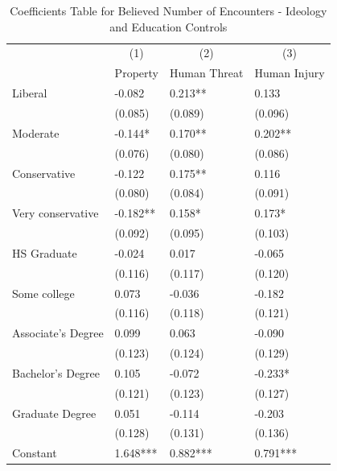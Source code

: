\documentclass[english,12pt]{article}
\begin{document}
\begin{table}[H]
    \centering
    \caption{Coefficients Table for Believed Number of Encounters - Ideology and Education Controls}
    \footnotesize
    \begin{tabular}{@{}llll@{}}
        \toprule
                           &\multicolumn{1}{c}{(1)}   &\multicolumn{1}{c}{(2)}   &\multicolumn{1}{c}{(3)}  \\
                           & Property & Human Threat & Human Injury \\ \midrule
        Liberal     &      -0.082   &       0.213** &       0.133   \\
                    &     (0.085)   &     (0.089)   &     (0.096)   \\
        Moderate    &      -0.144*  &       0.170** &       0.202** \\
                    &     (0.076)   &     (0.080)   &     (0.086)   \\
        Conservative&      -0.122   &       0.175** &       0.116   \\
                    &     (0.080)   &     (0.084)   &     (0.091)   \\
        Very conservative&      -0.182** &       0.158*  &       0.173*  \\
                    &     (0.092)   &     (0.095)   &     (0.103)   \\
        HS Graduate &      -0.024   &       0.017   &      -0.065   \\
                    &     (0.116)   &     (0.117)   &     (0.120)   \\
        Some college&       0.073   &      -0.036   &      -0.182   \\
                    &     (0.116)   &     (0.118)   &     (0.121)   \\
        Associate's Degree&       0.099   &       0.063   &      -0.090   \\
                    &     (0.123)   &     (0.124)   &     (0.129)   \\
        Bachelor's Degree&       0.105   &      -0.072   &      -0.233*  \\
                    &     (0.121)   &     (0.123)   &     (0.127)   \\
        Graduate Degree&       0.051   &      -0.114   &      -0.203   \\
                    &     (0.128)   &     (0.131)   &     (0.136)   \\\midrule                       
        Constant    &       1.648***&       0.882***&       0.791***\\

\end{tabular}
\end{table}
\end{document}
